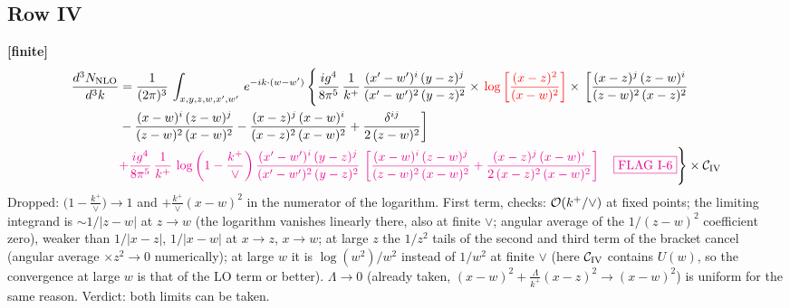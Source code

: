 \documentclass[9pt]{article}
\numberwithin{equation}{section}
\begin{document}
\subsection{Row IV}
\textbf{[finite]}
\begin{align}
    \frac{d^{3}N_{\rm NLO}}{d^{3}k}  & =   \frac{1}{(2\pi)^{3}}\,
    \int_{x,y,z,w,x',w'}\,e^{-ik\cdot (w-w^\prime)}\,\Bigg\{
 \frac{ig^{4}}{8\pi^{5}}\,\frac{1}{k^{+}}\,\frac{(x'-w')^{i}\,(y-z)^{j}}{(x'-w')^{2}\,(y-z)^{2}}\times\,{\color{red}\log{\left[\frac{(x-z)^{2}}{(x-w)^{2}}\right]}}\times\, \bigg[\frac{(x-z)^{j}\,(z-w)^{i}}{(z-w)^{2}\,(x-z)^{2}}\notag \\ & -\frac{(x-w)^{i}\,(z-w)^{j}}{(z-w)^{2}\,(x-w)^{2}}-\frac{(x-z)^{j}\,(x-w)^{i}}{(x-z)^{2}\,(x-w)^{2}}+\frac{\delta^{ij}}{2\,(z-w)^{2}}\bigg] \notag \\
& {\color{magenta}+ \frac{ig^{4}}{8\pi^{5}}\,\frac{1}{k^{+}}\,\log{\left(1-\frac{k^{+}}{\vee}\right)}\,\frac{(x'-w')^{i}\,(y-z)^{j}}{(x'-w')^{2}\,(y-z)^{2}}\,\left[\frac{(x-w)^{i}\,(z-w)^{j}}{(z-w)^{2}\,(x-w)^{2}}+\frac{(x-z)^{j}\,(x-w)^{i}}{2\, (x-z)^{2}\,(x-w)^{2}}\right]\quad\fbox{FLAG I-6}}\Bigg\}\times\mathcal{C}_{\rm IV}
\end{align}
{\color{orange}Dropped: $\big(1-\frac{k^{+}}{\vee}\big)\to1$ and $+\frac{k^{+}}{\vee}(x-w)^{2}$ in the numerator of the logarithm.} First term, checks: ${\cal O}(k^{+}/\vee)$ at fixed points; the limiting integrand is $\sim1/|z-w|$ at $z\to w$ (the logarithm vanishes linearly there, also at finite $\vee$; angular average of the $1/(z-w)^{2}$ coefficient zero), weaker than $1/|x-z|$, $1/|x-w|$ at $x\to z$, $x\to w$; at large $z$ the $1/z^{2}$ tails of the second and third term of the bracket cancel (angular average $\times z^{2}\to0$ numerically); at large $w$ it is $\log(w^{2})/w^{2}$ instead of $1/w^{2}$ at finite $\vee$ (here $\mathcal{C}_{\rm IV}$ contains $U(w)$, so the convergence at large $w$ is that of the LO term or better). $\Lambda\to0$ (already taken, $(x-w)^{2}+\frac{\Lambda}{k^{+}}(x-z)^{2}\to(x-w)^{2}$) is uniform for the same reason. Verdict: both limits can be taken.

\end{document}
